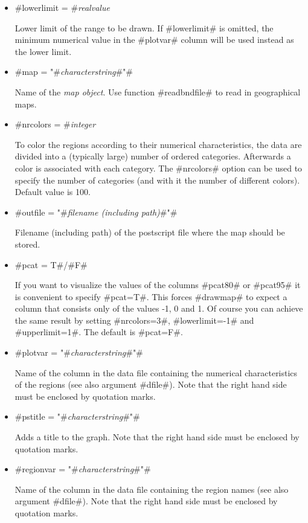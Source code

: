 \begin{itemize}
\item #lowerlimit = #{\em realvalue}

Lower limit of the range to be drawn. If #lowerlimit# is omitted,
the minimum numerical value in the #plotvar# column will be used
instead as the lower limit.

\item #map = "#{\em characterstring}#"#

Name of the {\em map object}. Use function #readbndfile# to read in
geographical maps.

\item #nrcolors = #{\em integer}

To color the regions according to their numerical characteristics,
the data are divided into a (typically large) number of ordered
categories. Afterwards a color is associated with each category. The
#nrcolors# option can be used to specify the number of categories
(and with it the number of different colors). Default value is 100.

\item #outfile = "#{\em filename (including path)}#"#

Filename (including path) of the postscript file where the map
should be stored.

\item #pcat = T#/#F#

If you want to visualize the values of the columns #pcat80# or
#pcat95# it is convenient to specify #pcat=T#. This forces #drawmap#
to expect a column that consists only of the values -1, 0 and 1. Of
course you can achieve the same result by setting #nrcolors=3#,
#lowerlimit=-1# and #upperlimit=1#. The default is #pcat=F#.

\item #plotvar = "#{\em characterstring}#"#

Name of the column in the data file containing the numerical
characteristics of the regions (see also argument #dfile#). Note
that the right hand side must be enclosed by quotation marks.

\item #pstitle = "#{\em characterstring}#"#

Adds a title to the graph. Note that the right hand side must be
enclosed by quotation marks.

\item #regionvar = "#{\em characterstring}#"#

Name of the column in the data file containing the region names
(see also argument #dfile#). Note that the right hand side must be
enclosed by quotation marks.


\end{itemize}
